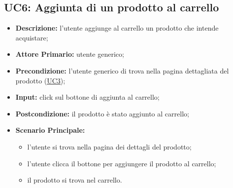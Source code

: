 \subsection{UC6: Aggiunta di un prodotto al carrello}
        \label{sec:UC6}
        \begin{itemize}
            \item \textbf{Descrizione:} l'utente aggiunge al carrello un prodotto che intende acquistare;
            \item \textbf{Attore Primario:} utente generico;
            \item \textbf{Precondizione:} l'utente generico di trova nella pagina dettagliata del prodotto (\hyperref[sec:UC3]{\underline{UC3}});
            \item \textbf{Input:} click sul bottone di aggiunta al carrello;
            \item \textbf{Postcondizione:} il prodotto è stato aggiunto al carrello;
            \item \textbf{Scenario Principale:}
            \begin{itemize}
                \item l'utente si trova nella pagina dei dettagli del prodotto;
                \item l'utente clicca il bottone per aggiungere il prodotto al carrello;
                \item il prodotto si trova nel carrello.
            \end{itemize}
        \end{itemize}
